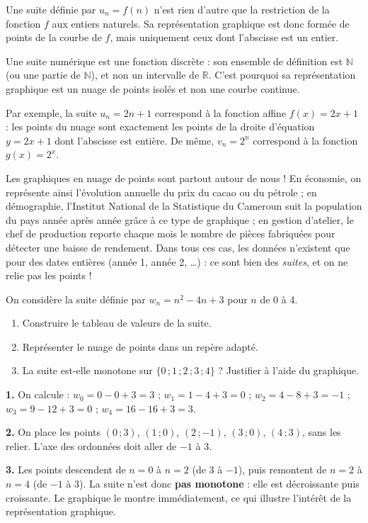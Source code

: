 \documentclass[11pt]{article}
\newcommand{\cle}[1]{{\popxbold\color{popdark}#1}}
\begin{document}
Une suite définie par $u_n = f(n)$ n'est rien d'autre que la restriction de la fonction $f$ aux \cle{entiers naturels}. Sa représentation graphique est donc formée de points de la courbe de $f$, mais uniquement ceux dont l'abscisse est un entier.

\begin{aretenir}[Suite = fonction discrète]
Une suite numérique est une \cle{fonction discrète} : son ensemble de définition est $\mathbb{N}$ (ou une partie de $\mathbb{N}$), et non un intervalle de $\mathbb{R}$. C'est pourquoi sa représentation graphique est un \cle{nuage de points isolés} et non une courbe continue.
\end{aretenir}

Par exemple, la suite $u_n = 2n+1$ correspond à la fonction affine $f(x) = 2x+1$ : les points du nuage sont exactement les points de la droite d'équation $y = 2x+1$ dont l'abscisse est entière. De même, $v_n = 2^n$ correspond à la fonction $g(x) = 2^x$.

\begin{savaistu}
Les graphiques en nuage de points sont partout autour de nous ! En \cle{économie}, on représente ainsi l'évolution annuelle du prix du cacao ou du pétrole ; en \cle{démographie}, l'Institut National de la Statistique du Cameroun suit la population du pays année après année grâce à ce type de graphique ; en \cle{gestion d'atelier}, le chef de production reporte chaque mois le nombre de pièces fabriquées pour détecter une baisse de rendement. Dans tous ces cas, les données n'existent que pour des dates entières (année 1, année 2, \ldots) : ce sont bien des \emph{suites}, et on ne relie pas les points !
\end{savaistu}

\begin{exercice}
On considère la suite définie par $w_n = n^2 - 4n + 3$ pour $n$ de 0 à 4.
\begin{enumerate}
\item Construire le tableau de valeurs de la suite.
\item Représenter le nuage de points dans un repère adapté.
\item La suite est-elle monotone sur $\{0\,;1\,;2\,;3\,;4\}$ ? Justifier à l'aide du graphique.
\end{enumerate}
\end{exercice}

\begin{corrige}[Exercice 1]
\textbf{1.} On calcule : $w_0 = 0 - 0 + 3 = 3$ ; $w_1 = 1 - 4 + 3 = 0$ ; $w_2 = 4 - 8 + 3 = -1$ ; $w_3 = 9 - 12 + 3 = 0$ ; $w_4 = 16 - 16 + 3 = 3$.

\textbf{2.} On place les points $(0\,;3)$, $(1\,;0)$, $(2\,;-1)$, $(3\,;0)$, $(4\,;3)$, sans les relier. L'axe des ordonnées doit aller de $-1$ à $3$.

\textbf{3.} Les points descendent de $n=0$ à $n=2$ (de $3$ à $-1$), puis remontent de $n=2$ à $n=4$ (de $-1$ à $3$). La suite n'est donc \textbf{pas monotone} : elle est décroissante puis croissante. Le graphique le montre immédiatement, ce qui illustre l'intérêt de la représentation graphique.
\end{corrige}
\end{document}
